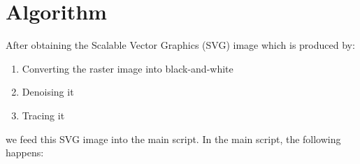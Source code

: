 \documentclass{dalthesis}
\begin{document}
\chapter{Algorithm}\label{sec:algorithm}

After obtaining the Scalable Vector Graphics (SVG) image which is produced by:

\begin{enumerate}
  \item Converting the raster image into black-and-white
  \item Denoising it
  \item Tracing it
\end{enumerate}

\noindent
we feed this SVG image into the main script. In the main script, the following happens:
\end{document}
